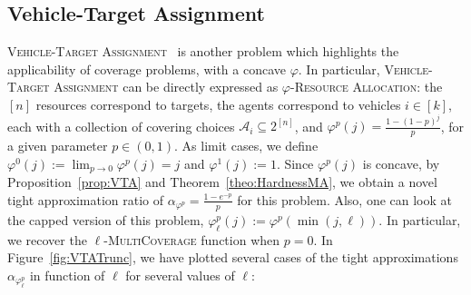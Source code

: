 \subsection{Vehicle-Target Assignment}
\label{subsection:vehicle-target}
\textsc{Vehicle-Target Assignment}~\cite{Murphey00,PM19} is another problem which highlights the applicability of coverage problems, with a concave $\varphi$. In particular, \textsc{Vehicle-Target Assignment} can be directly expressed as $\varphi$-\textsc{Resource Allocation}: the $[n]$ resources correspond to targets, the agents correspond to vehicles $i \in [k]$, each  with a collection of covering choices $\mathcal{A}_i \subseteq 2^{[n]}$, and $\varphi^p(j) = \frac{1-(1-p)^j}{p}$, for a given parameter $p \in (0,1)$. As limit cases, we define $\varphi^0(j) := \lim_{p \rightarrow 0} \varphi^p(j) = j$ and $\varphi^1(j) := 1$. Since $\varphi^p(j)$ is concave, by Proposition~\ref{prop:VTA} and Theorem~\ref{theo:HardnessMA}, we obtain a novel tight approximation ratio of $\alpha_{\varphi^p} = \frac{1 - e^{-p}}{p}$ for this problem. Also, one can look at the capped version of this problem, $\varphi^p_{\ell}(j) := \varphi^p(\min(j,\ell))$. In particular, we recover the $\ell$-\textsc{MultiCoverage} function when $p=0$. In Figure~\ref{fig:VTATrunc}, we have plotted several cases of the tight approximations $\alpha_{\varphi^p_{\ell}}$ in function of $\ell$ for several values of $\ell$:

